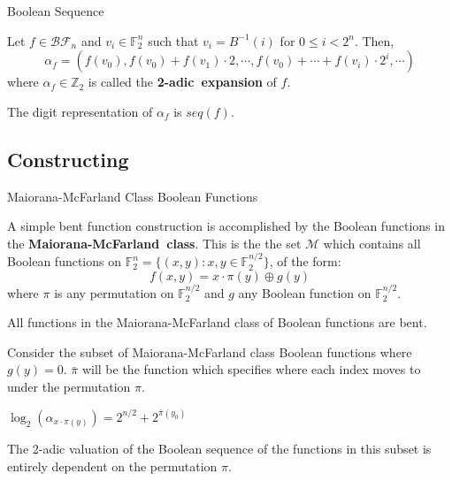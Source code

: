 \documentclass{beamer}
\def\zzz{\mathbb{Z}}
\def\gftwo{\mathbb{F}_2}
\def\BF{\mathcal{BF}}
\begin{document}
\begin{frame}{Boolean Sequence}
  \begin{definition}\label{2-adic-ex}
    Let $f\in\BF_n$ and $v_i\in\gftwo^n$ such that $v_i=B^{-1}(i)$ for
    $0\leq i<2^n$. Then,
    \begin{equation}
      \alpha_f=(f(v_0),f(v_0)+f(v_1)\cdot2,\cdots,\allowbreak
        f(v_0)+\cdots\allowbreak+f(v_i)\cdot2^i,\allowbreak\cdots)
    \end{equation}
    where $\alpha_f\in\zzz_2$ is called the {\bf 2-adic\ expansion} of $f$.
  \end{definition}
  
  \begin{lemma}
    The digit representation of $\alpha_f$ is $seq(f)$.
  \end{lemma}
\end{frame}

\subsection{Constructing}
\begin{frame}{Maiorana-McFarland Class Boolean Functions}
  \par A simple bent function construction is accomplished by the Boolean
  functions in the {\bf Maiorana-McFarland\ class}. This is the the set
  $\mathcal{M}$ which contains all Boolean functions on
  $\gftwo^n=\{(x,y):x,y\in\gftwo^{n/2}\}$, of the form:
    \[
    f(x,y)=x\cdot\pi(y)\oplus g(y)
    \]
  where $\pi$ is any permutation on $\gftwo^{n/2}$ and $g$ any Boolean
  function on $\gftwo^{n/2}$.\\
  \vspace{5mm} 
  \par All functions in the Maiorana-McFarland class of Boolean functions are
  bent.
\end{frame}
  
\begin{frame}
  \par Consider the subset of Maiorana-McFarland class Boolean functions where
  $g(y)=0$. $\bar{\pi}$ will be the function which specifies where each
  index moves to under the permutation $\pi$.
  \vspace{5mm}  
  \begin{theorem}
    $\log_2(\alpha_{x\cdot\pi(y)})=2^{n/2}+2^{\bar{\pi}(y_0)}$
  \end{theorem}
  \vspace{5mm}
  The 2-adic valuation of the Boolean sequence of the functions in this
  subset is entirely dependent on the permutation $\pi$.
\end{frame}
\end{document}
